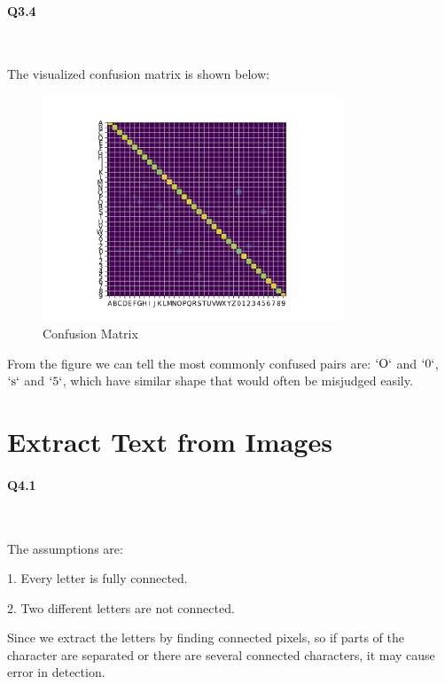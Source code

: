 \documentclass[11pt]{article} \usepackage{fullpage} \usepackage{graphicx} \usepackage{epstopdf} \usepackage{color} \usepackage{psfrag} \usepackage{pdfsync}\usepackage{indentfirst}\usepackage{subfigure}\usepackage{float}\usepackage[section]{placeins}
\begin{document}
\paragraph{Q3.4}~{}

The visualized confusion matrix is shown below:
\begin{figure}[H]
\centering
\includegraphics[width=0.8\textwidth]{results/q3_4.png}
\caption{Confusion Matrix}
\end{figure}

From the figure we can tell the most commonly confused pairs are: $`\mathrm{O}`$ and $`0`$, $`\mathrm{s}`$ and $`5`$, which have similar shape that would often be misjudged easily.

\section{Extract Text from Images}

\paragraph{Q4.1}~{}

The assumptions are:

1. Every letter is fully connected.

2. Two different letters are not connected.

Since we extract the letters by finding connected pixels, so if parts of the character are separated or there are several connected characters, it may cause error in detection.
\end{document}
